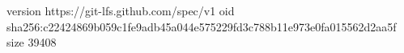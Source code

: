 version https://git-lfs.github.com/spec/v1
oid sha256:c22424869b059c1fe9adb45a044e575229fd3c788b11e973e0fa015562d2aa5f
size 39408
